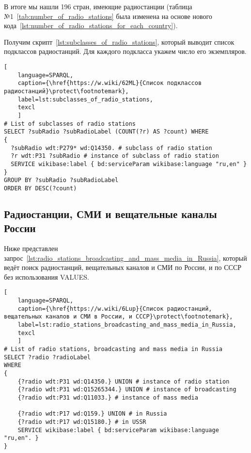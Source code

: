 
В итоге мы нашли \num{196} стран, имеющие радиостанции (таблица №1~\ref{tab:number_of_radio_stations} была изменена на основе нового кода~\ref{lst:number_of_radio_stations_for_each_country}).

Получим скрипт~\ref{lst:subclasses_of_radio_stations}, который выводит список подклассов радиостанций. Для каждого подкласса укажем число его экземпляров.

\begin{lstlisting}[ 
    language=SPARQL,
    caption={\href{https://w.wiki/62ML}{Список подклассов радиостанций}\protect\footnotemark},
    label=lst:subclasses_of_radio_stations,
    texcl
    ]
# List of subclasses of radio stations  
SELECT ?subRadio ?subRadioLabel (COUNT(?r) AS ?count) WHERE
{
  ?subRadio wdt:P279* wd:Q14350. # subclass of radio station
  ?r wdt:P31 ?subRadio # instance of subclass of radio station 
  SERVICE wikibase:label { bd:serviceParam wikibase:language "ru,en" }
}
GROUP BY ?subRadio ?subRadioLabel
ORDER BY DESC(?count)\end{lstlisting}%


\newpage

\subsection{Радиостанции, СМИ и вещательные каналы России}

Ниже представлен запрос~\ref{lst:radio_stations_broadcasting_and_mass_media_in_Russia}, который ведёт поиск радиостанций, вещательных каналов и СМИ по России, и по СССР без использования VALUES.

\begin{lstlisting}[ 
    language=SPARQL,
    caption={\href{https://w.wiki/6Lup}{Список радиостанций, вещательных каналов и СМИ в России, и СССР}\protect\footnotemark},
    label=lst:radio_stations_broadcasting_and_mass_media_in_Russia,
    texcl
    ]
# List of radio stations, broadcasting and mass media in Russia 
SELECT ?radio ?radioLabel
WHERE
{
    {?radio wdt:P31 wd:Q14350.} UNION # instance of radio station
    {?radio wdt:P31 wd:Q15265344.} UNION # instance of broadcasting
    {?radio wdt:P31 wd:Q11033.} # instance of mass media
    
    {?radio wdt:P17 wd:Q159.} UNION # in Russia
    {?radio wdt:P17 wd:Q15180.} # in USSR
    SERVICE wikibase:label { bd:serviceParam wikibase:language "ru,en". }
}\end{lstlisting}%

